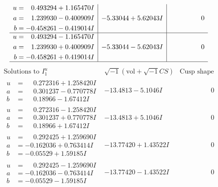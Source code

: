 \documentclass[1p]{elsarticle_modified}
\theoremstyle{definition}
\newcommand{\I}{\sqrt{-1}}
\begin{document}
$$\begin{array}{c|c|c}
\begin{aligned}
u &= \phantom{-}0.493294 + 1.165470 I \\
a &= \phantom{-}1.239930 - 0.400909 I \\
b &= -0.458261 - 0.419014 I\end{aligned}
 & -5.33044 + 5.62043 I & \phantom{-0.000000 } 0 \\ \hline\begin{aligned}
u &= \phantom{-}0.493294 - 1.165470 I \\
a &= \phantom{-}1.239930 + 0.400909 I \\
b &= -0.458261 + 0.419014 I\end{aligned}
 & -5.33044 - 5.62043 I & \phantom{-0.000000 } 0\\
 \hline 
 \end{array}$$\newpage$$\begin{array}{c|c|c}  
\text{Solutions to }I^u_{1}& \I (\text{vol} + \sqrt{-1}CS) & \text{Cusp shape}\\
 \hline 
\begin{aligned}
u &= \phantom{-}0.272316 + 1.258420 I \\
a &= \phantom{-}0.301237 - 0.770778 I \\
b &= \phantom{-}0.18966 - 1.67412 I\end{aligned}
 & -13.4813 - 5.1046 I & \phantom{-0.000000 } 0 \\ \hline\begin{aligned}
u &= \phantom{-}0.272316 - 1.258420 I \\
a &= \phantom{-}0.301237 + 0.770778 I \\
b &= \phantom{-}0.18966 + 1.67412 I\end{aligned}
 & -13.4813 + 5.1046 I & \phantom{-0.000000 } 0 \\ \hline\begin{aligned}
u &= \phantom{-}0.292425 + 1.259690 I \\
a &= -0.162036 + 0.763414 I \\
b &= -0.05529 + 1.59185 I\end{aligned}
 & -13.77420 + 1.43522 I & \phantom{-0.000000 } 0 \\ \hline\begin{aligned}
u &= \phantom{-}0.292425 - 1.259690 I \\
a &= -0.162036 - 0.763414 I \\
b &= -0.05529 - 1.59185 I\end{aligned}
 & -13.77420 - 1.43522 I & \phantom{-0.000000 } 0 \\ \hline\begin{aligned}

\end{aligned}
\end{array}$$
\end{document}
